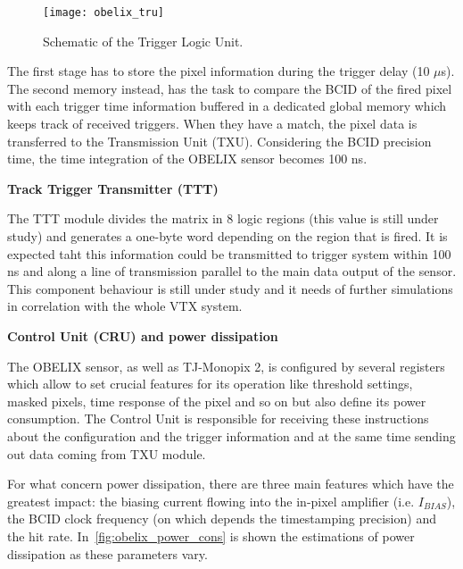 \begin{figure}[h!]
\centering
\texttt{[image: obelix\_tru]}
\caption{Schematic of the Trigger Logic Unit.}
\label{fig:obelix_tru}
\end{figure}

The first stage has to store the pixel information during the trigger delay (10 $\mu$s). The second memory instead, has the task to compare the BCID of the fired pixel with each trigger time information buffered in a dedicated global memory which keeps track of received triggers. When they have a match, the pixel data is transferred to the Transmission Unit (TXU). Considering the BCID precision time, the time integration of the OBELIX sensor becomes 100 ns.



\begin{description}
\item \textbf{Track Trigger Transmitter (TTT)}
\end{description}

The TTT module divides the matrix in 8 logic regions (this value is still under study) and generates a one-byte word depending on the region that is fired. It is expected taht this information could be transmitted to trigger system within 100 ns and along a line of transmission parallel to the main data output of the sensor. 
This component behaviour is still under study and it needs of further simulations in correlation with the whole VTX system.


\begin{description}
\item \textbf{Control Unit (CRU) and power dissipation}
\end{description}

The OBELIX sensor, as well as TJ-Monopix 2, is configured by several registers which allow to set crucial features for its operation like threshold settings, masked pixels, time response of the pixel and so on but also define its power consumption. The Control Unit is responsible for receiving these instructions about the configuration and the trigger information and at the same time sending out data coming from TXU module.

For what concern power dissipation, there are three main features which have the greatest impact: the biasing current flowing into the in-pixel amplifier (i.e. \textit{$I_{BIAS}$}), the BCID clock frequency (on which depends the timestamping precision) and the hit rate. In~\autoref{fig:obelix_power_cons} is shown the estimations of power dissipation as these parameters vary.


